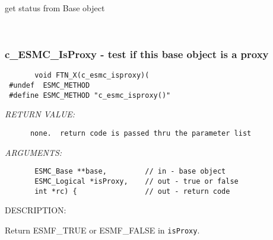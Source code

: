        get status from Base object
   
 
\mbox{}\hrulefill\ 
 
\subsubsection [c\_ESMC\_IsProxy] {c\_ESMC\_IsProxy - test if this base object is a proxy}


  
\begin{verbatim}       void FTN_X(c_esmc_isproxy)(
 #undef  ESMC_METHOD
 #define ESMC_METHOD "c_esmc_isproxy()"\end{verbatim}{\em RETURN VALUE:}
\begin{verbatim}      none.  return code is passed thru the parameter list
   \end{verbatim}{\em ARGUMENTS:}
\begin{verbatim}       ESMC_Base **base,         // in - base object
       ESMC_Logical *isProxy,    // out - true or false
       int *rc) {                // out - return code
   \end{verbatim}
{\sf DESCRIPTION:\\ }


       Return ESMF\_TRUE or ESMF\_FALSE in {\tt isProxy}.
  
\setlength{\parskip}{\oldparskip}
\setlength{\parindent}{\oldparindent}
\setlength{\baselineskip}{\oldbaselineskip}
